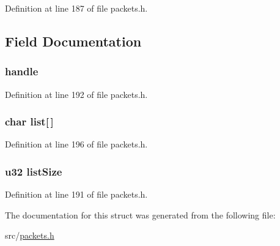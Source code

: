 Definition at line 187 of file packets.\+h.



\subsection{Field Documentation}
\hypertarget{struct_l_i_s_t___f_i_l_e_s___r_e_p_l_y_aecb23f809384319c09f5c91846a0a49e}{}
\subsubsection[{handle}]{ handle}\label{struct_l_i_s_t___f_i_l_e_s___r_e_p_l_y_aecb23f809384319c09f5c91846a0a49e}


Definition at line 192 of file packets.\+h.

\hypertarget{struct_l_i_s_t___f_i_l_e_s___r_e_p_l_y_aff445b895fa0846e460f0c83e186647d}{}
\subsubsection[{list}]{\setlength{\rightskip}{0pt plus 5cm}char list\mbox{[}$\,$\mbox{]}}\label{struct_l_i_s_t___f_i_l_e_s___r_e_p_l_y_aff445b895fa0846e460f0c83e186647d}


Definition at line 196 of file packets.\+h.

\hypertarget{struct_l_i_s_t___f_i_l_e_s___r_e_p_l_y_a5a4efbe028da0ce77ddfd353ff9dacef}{}
\subsubsection[{list\+Size}]{ {\bf u32} list\+Size}\label{struct_l_i_s_t___f_i_l_e_s___r_e_p_l_y_a5a4efbe028da0ce77ddfd353ff9dacef}


Definition at line 191 of file packets.\+h.



The documentation for this struct was generated from the following file\+:\begin{DoxyCompactItemize}
\item 
src/\hyperlink{packets_8h}{packets.\+h}\end{DoxyCompactItemize}
